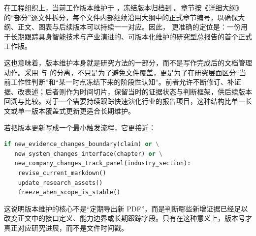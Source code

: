 在工程组织上，当前工作版本维护于 ，冻结版本归档到 。章节按《详细大纲》的“部分”逐文件拆分，每个文件内部继续沿用大纲中的正式章节编号，以确保大纲、正文、图表与后续版本可以持续一一对应。因此，\texttt{} 更准确的定位是：一份用于长期跟踪具身智能技术与产业演进的、可版本化维护的研究型总报告的首个正式工作版。

这也意味着，版本维护本身就是研究方法的一部分，而不是写作完成后的文档管理动作。采用  与  的分离，不只是为了避免文件覆盖，更是为了在研究层面区分“当前工作性判断”和“某一时点冻结下来的阶段性认知”。前者允许不断修订、补证据、改表述；后者则作为时间切片，保留当时的证据状态与判断框架，供后续版本回溯与比较。对于一个需要持续跟踪快速演化行业的报告项目，这种结构比单一长文或单一版本覆盖式更新更适合长期维护。

若把版本更新写成一个最小触发流程，它更接近：

\begin{lstlisting}[language=python]
if new_evidence_changes_boundary(claim) or \
   new_system_changes_interface(chapter) or \
   new_company_changes_track_panel(industry_section):
    revise_current_markdown()
    update_research_assets()
    freeze_when_scope_is_stable()
\end{lstlisting}

这说明版本维护的核心不是“定期导出新 PDF”，而是判断哪些新增证据已经足以改变正文中的接口定义、能力边界或长期跟踪字段。只有在这种意义上，版本号才真正对应研究进展，而不是文件时间戳。
